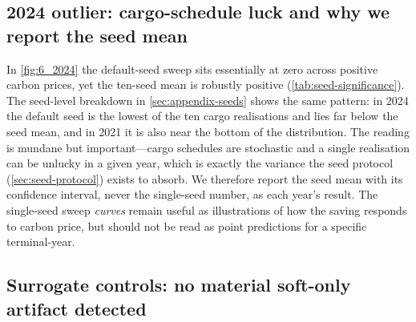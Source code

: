 \documentclass[11pt]{article}
\begin{document}
\subsection{2024 outlier: cargo-schedule luck and why we report the seed mean}
\label{sec:2024-outlier}

In \cref{fig:6_2024} the default-seed sweep sits essentially at zero across
positive carbon prices, yet the ten-seed mean is robustly positive
(\cref{tab:seed-significance}). The seed-level breakdown in
\cref{sec:appendix-seeds} shows the same pattern: in 2024 the default seed is
the lowest of the ten cargo realisations and lies far below the seed mean,
and in 2021 it is also near the bottom of the distribution. The reading
is mundane but important---cargo schedules are stochastic and a single
realisation can be unlucky in a given year, which is exactly the variance the
seed protocol (\cref{sec:seed-protocol}) exists to absorb. We therefore
report the seed mean with its confidence interval, never the single-seed
number, as each year's result. The single-seed sweep \emph{curves} remain
useful as illustrations of how the saving responds to carbon price, but
should not be read as point predictions for a specific terminal-year.

\subsection{Surrogate controls: no material soft-only artifact detected}
\label{sec:methodological-warning}
\end{document}
